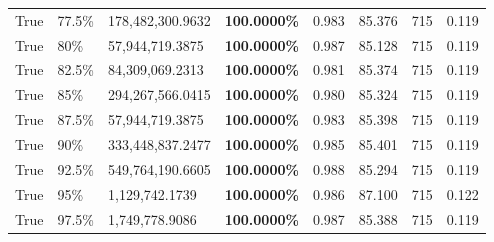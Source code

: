 \begin{table}[H]
\begin{tabular}{lllrllll}
\cline{1-8} \cline{2-8}
True & 77.5\% & 178,482,300.9632 & \bfseries \color{red} 100.0000\% & 0.983 & 85.376 & 715 & 0.119 \\
\cline{1-8} \cline{2-8}
True & 80\% & 57,944,719.3875 & \bfseries \color{red} 100.0000\% & 0.987 & 85.128 & 715 & 0.119 \\
\cline{1-8} \cline{2-8}
True & 82.5\% & 84,309,069.2313 & \bfseries \color{red} 100.0000\% & 0.981 & 85.374 & 715 & 0.119 \\
\cline{1-8} \cline{2-8}
True & 85\% & 294,267,566.0415 & \bfseries \color{red} 100.0000\% & 0.980 & 85.324 & 715 & 0.119 \\
\cline{1-8} \cline{2-8}
True & 87.5\% & 57,944,719.3875 & \bfseries \color{red} 100.0000\% & 0.983 & 85.398 & 715 & 0.119 \\
\cline{1-8} \cline{2-8}
True & 90\% & 333,448,837.2477 & \bfseries \color{red} 100.0000\% & 0.985 & 85.401 & 715 & 0.119 \\
\cline{1-8} \cline{2-8}
True & 92.5\% & 549,764,190.6605 & \bfseries \color{red} 100.0000\% & 0.988 & 85.294 & 715 & 0.119 \\
\cline{1-8} \cline{2-8}
True & 95\% & 1,129,742.1739 & \bfseries \color{red} 100.0000\% & 0.986 & 87.100 & 715 & 0.122 \\
\cline{1-8} \cline{2-8}
True & 97.5\% & 1,749,778.9086 & \bfseries \color{red} 100.0000\% & 0.987 & 85.388 & 715 & 0.119 \\
\cline{1-8} \cline{2-8}
\bottomrule
\end{tabular}
\end{table}
